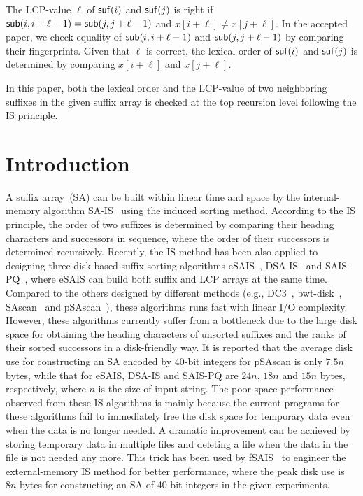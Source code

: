 \documentclass[10pt,journal,compsoc]{IEEEtran}
\begin{document}
\maketitle

\IEEEdisplaynontitleabstractindextext

\IEEEpeerreviewmaketitle

{\color{red}

The LCP-value $\ell$ of ${\sf suf}(i)$ and ${\sf suf}(j)$ is right if ${\sf sub}(i, i + \ell - 1) = {\sf sub}(j, j + \ell - 1)$ and $x[i + \ell] \ne x[j + \ell]$. In the accepted paper, we check equality of ${\sf sub}(i, i + \ell - 1)$ and ${\sf sub}(j, j + \ell - 1)$ by comparing their fingerprints. Given that $\ell$ is correct, the lexical order of ${\sf suf}(i)$ and ${\sf suf}(j)$ is determined by comparing $x[i + \ell]$ and $x[j + \ell]$.  

In this paper, both the lexical order and the LCP-value of two neighboring suffixes in the given suffix array is checked at the top recursion level following the IS principle. 

}

\section{Introduction}\label{sec:introduction}

A suffix array~(SA) can be built within linear time and space by the internal-memory algorithm SA-IS~\cite{Nong11} using the induced sorting method. According to the IS principle, the order of two suffixes is determined by comparing their heading characters and successors in sequence, where the order of their successors is determined recursively. Recently, the IS method has been also applied to designing three disk-based suffix sorting algorithms eSAIS~\cite{Bingmann12}, DSA-IS~\cite{Nong15} and SAIS-PQ~\cite{Liu15}, where eSAIS can build both suffix and LCP arrays at the same time. Compared to the others designed by different methods (e.g., DC3~\cite{Dementiev2008a}, bwt-disk~\cite{Ferragina2012}, SAscan~\cite{Karkkainen2014} and pSAscan~\cite{Karkkainen2015}), these algorithms runs fast with linear I/O complexity. However, these algorithms currently suffer from a bottleneck due to the large disk space for obtaining the heading characters of unsorted suffixes and the ranks of their sorted successors in a disk-friendly way. It is reported that the average disk use for constructing an SA encoded by 40-bit integers for pSAscan is only $7.5n$ bytes, while that for eSAIS, DSA-IS and SAIS-PQ are $24n$, $18n$ and $15n$ bytes, respectively, where $n$ is the size of input string. The poor space performance observed from these IS algorithms is mainly because the current programs for these algorithms fail to immediately free the disk space for temporary data even when the data is no longer needed. A dramatic improvement can be achieved by storing temporary data in multiple files and deleting a file when the data in the file is not needed any more. This trick has been used by fSAIS~\cite{Karkkainen2017} to engineer the external-memory IS method for better performance, where the peak disk use is $8n$ bytes for constructing an SA of 40-bit integers in the given experiments.
\end{document}

